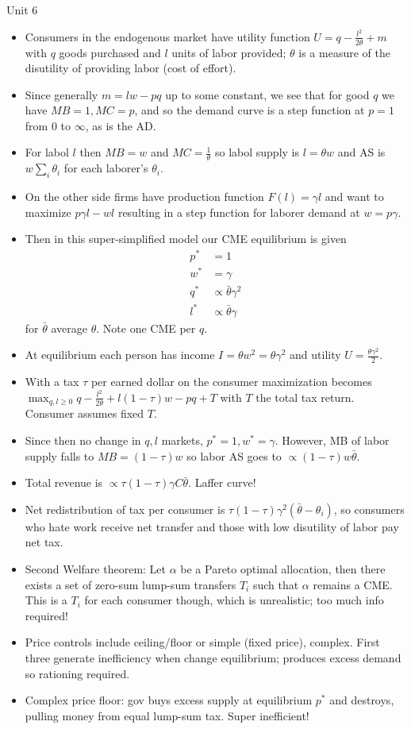 \documentclass[10pt,twocolumn]{article}
\begin{document}
Unit 6
\begin{itemize}
    \item Consumers in the endogenous market have utility function $U = q - \frac{l^2}{2\theta} + m$ with $q$ goods purchased and $l$ units of labor provided; $\theta$ is a measure of the disutility of providing labor (cost of effort).
    \item Since generally $m = lw - pq$ up to some constant, we see that for good $q$ we have $MB = 1, MC = p$, and so the demand curve is a step function at $p=1$ from $0$ to $\infty$, as is the AD.
    \item For labol $l$ then $MB = w$ and $MC = \frac{1}{\theta}$ so labol supply is $l = \theta w$ and AS is $w \sum_{i}^{}\theta_i$ for each laborer's $\theta_i$.
    \item On the other side firms have production function $F(l) = \gamma l$ and want to maximize $p\gamma l - wl$ resulting in a step function for laborer demand at $w=p\gamma$.
    \item Then in this super-simplified model our CME equilibrium is given 
        \begin{align}
            p^* &= 1\\
            w^* &= \gamma\\
            q^* &\propto \bar{\theta}\gamma^2\\
            l^* &\propto \bar{\theta}\gamma
        \end{align} for $\bar{\theta}$ average $\theta$. Note one CME per $q$. 
    \item At equilibrium each person has income $I = \theta w^2 = \theta\gamma^2$ and utility $U = \frac{\theta\gamma^2}{2}$. 
    \item With a tax $\tau$ per earned dollar on the consumer maximization becomes $\max_{q,l\geq0} q - \frac{l^2}{2\theta} + l(1-\tau)w - pq + T$ with $T$ the total tax return. Consumer assumes fixed $T$. 
    \item Since then no change in $q,l$ markets, $p^* = 1, w^* = \gamma$. However, MB of labor supply falls to $MB = (1-\tau)w$ so labor AS goes to $\propto(1-\tau)w\bar{\theta}$.
    \item Total revenue is $\propto \tau(1-\tau)\gamma C\bar{\theta}$. Laffer curve!
    \item Net redistribution of tax per consumer is $\tau(1-\tau)\gamma^2\left( \bar{\theta} - \theta_i \right)$, so consumers who hate work receive net transfer and those with low disutility of labor pay net tax. 
    \item Second Welfare theorem: Let $\alpha$ be a Pareto optimal allocation, then there exists a set of zero-sum lump-sum transfers $T_i$ such that $\alpha$ remains a CME. This is a $T_i$ for each consumer though, which is unrealistic; too much info required!
    \item Price controls include ceiling/floor or simple (fixed price), complex. First three generate inefficiency when change equilibrium; produces excess demand so rationing required.
    \item Complex price floor: gov buys excess supply at equilibrium $p^*$ and destroys, pulling money from equal lump-sum tax. Super inefficient!
\end{itemize}
\end{document}
